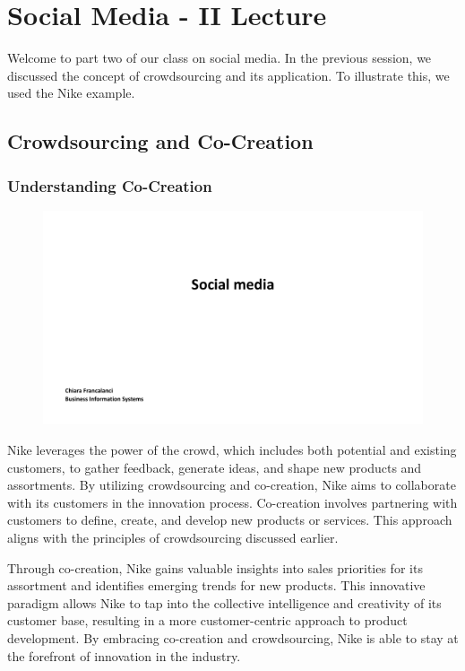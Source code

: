 \section{Social Media - II Lecture}

Welcome to part two of our class on social media. In the previous
session, we discussed the concept of crowdsourcing and its application.
To illustrate this, we used the Nike example.

\subsection{Crowdsourcing and
  Co-Creation}\label{crowdsourcing-and-co-creation}

\subsubsection{Understanding Co-Creation}\label{understanding-co-creation}

\begin{figure}[!h]
  \centering
  \includegraphics[page=11, trim = 1.5cm 3cm 2.5cm 3cm, clip, width=\imagewidth]{images/04 - Social_Media.pdf}
\end{figure}

Nike leverages the power of the crowd, which includes both potential and
existing customers, to gather feedback, generate ideas, and shape new
products and assortments. By utilizing crowdsourcing and co-creation,
Nike aims to collaborate with its customers in the innovation process.
Co-creation involves partnering with customers to define, create, and
develop new products or services. This approach aligns with the
principles of crowdsourcing discussed earlier.

Through co-creation, Nike gains valuable insights into sales priorities
for its assortment and identifies emerging trends for new products. This
innovative paradigm allows Nike to tap into the collective intelligence
and creativity of its customer base, resulting in a more
customer-centric approach to product development. By embracing
co-creation and crowdsourcing, Nike is able to stay at the forefront of
innovation in the industry.

